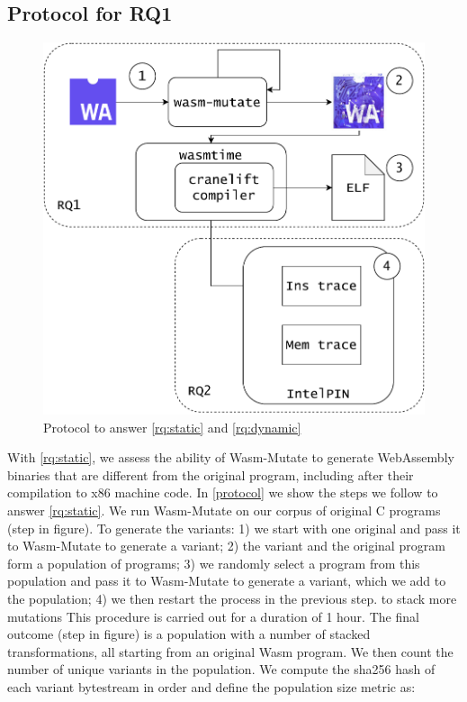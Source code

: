 \documentclass[sigplan,screen]{acmart}
\newcommand{\tool}{{\sc Wasm-Mutate}\xspace}
\newcommand{\wasm}{Wasm\xspace}
\newcommand{\Wasm}{WebAssembly\xspace}
\newcommand*\step[1]{
\noindent\tikz[baseline=(char.base)]{
        \node[shape=circle,text=black,draw=black, fill=white,inner sep=1.2pt] (char) {#1};}}
\begin{document}
\subsection{Protocol for RQ1}
\label{protocol:rq1}

\begin{figure}
    \centering
    \includegraphics[width=0.8\linewidth]{figures/protocol.pdf}
    \caption{Protocol to answer \ref{rq:static} and \ref{rq:dynamic}}
  \label{protocol}
\end{figure}


With \ref{rq:static},
we assess the ability of \tool to generate \Wasm binaries that are different from the original program, including after their compilation to x86 machine code.
In \autoref{protocol} we show the steps we follow to answer \ref{rq:static}.
We run \tool on our corpus of \nProgramsRosetta{} original C programs (step \step{1} in figure). 
To generate the variants:
1) we start with one original and pass it to \tool to generate a variant;  
2) the variant and the original program form a population of programs; 
3) we randomly select a program from this population and pass it to \tool to generate a variant, which we add to the population; 
4) we then restart the process in the previous step. to stack more mutations 
This procedure is carried out for a duration of 1 hour.
The final outcome (step \step{2} in figure) is a population with a number of stacked transformations, all starting from an original \wasm program.
We then count the number of unique variants in the population.
We compute the sha256 hash of each variant bytestream in order and define the population size metric as: 
\end{document}
